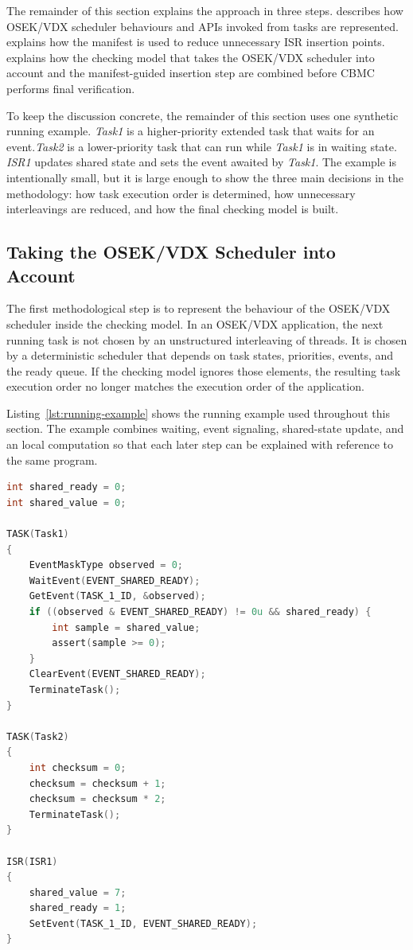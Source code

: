 The remainder of this section explains the approach in three steps.  describes how OSEK/VDX scheduler behaviours and APIs invoked from tasks are represented.  explains how the manifest is used to reduce unnecessary ISR insertion points.  explains how the checking model that takes the OSEK/VDX scheduler into account and the manifest-guided insertion step are combined before CBMC performs final verification.

To keep the discussion concrete, the remainder of this section uses one synthetic running example. \textit{Task1} is a higher-priority extended task that waits for an event.\textit{Task2} is a lower-priority task that can run while \textit{Task1} is in waiting state. \textit{ISR1} updates shared state and sets the event awaited by \textit{Task1}. The example is intentionally small, but it is large enough to show the three main decisions in the methodology: how task execution order is determined, how unnecessary interleavings are reduced, and how the final checking model is built.

\subsection{Taking the OSEK/VDX Scheduler into Account}
\label{sec:method-scheduler}

The first methodological step is to represent the behaviour of the OSEK/VDX scheduler inside the checking model. In an OSEK/VDX application, the next running task is not chosen by an unstructured interleaving of threads. It is chosen by a deterministic scheduler that depends on task states, priorities, events, and the ready queue. If the checking model ignores those elements, the resulting task execution order no longer matches the execution order of the application.

Listing~\ref{lst:running-example} shows the running example used throughout this section. The example combines waiting, event signaling, shared-state update, and an local computation so that each later step can be explained with reference to the same program.

\begin{lstlisting}[language=C,caption={Pseudo Code},label={lst:running-example}]
int shared_ready = 0;
int shared_value = 0;

TASK(Task1)
{
    EventMaskType observed = 0;
    WaitEvent(EVENT_SHARED_READY);
    GetEvent(TASK_1_ID, &observed);
    if ((observed & EVENT_SHARED_READY) != 0u && shared_ready) {
        int sample = shared_value;
        assert(sample >= 0);
    }
    ClearEvent(EVENT_SHARED_READY);
    TerminateTask();
}

TASK(Task2)
{
    int checksum = 0;
    checksum = checksum + 1;
    checksum = checksum * 2;
    TerminateTask();
}

ISR(ISR1)
{
    shared_value = 7;
    shared_ready = 1;
    SetEvent(TASK_1_ID, EVENT_SHARED_READY);
}
\end{lstlisting}

